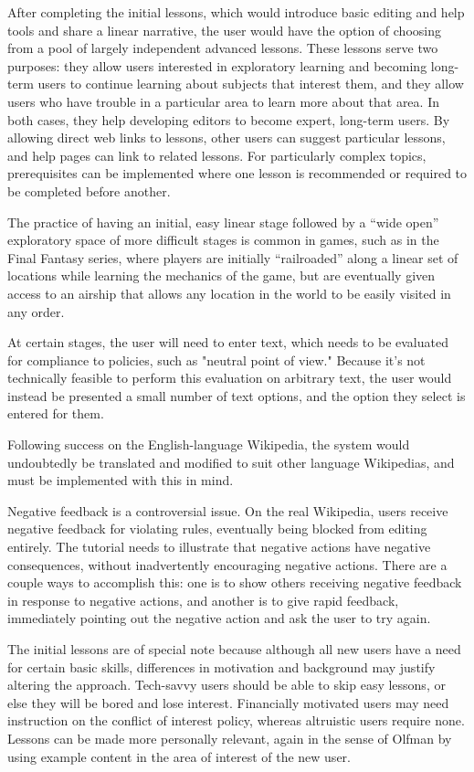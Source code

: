 \documentclass{acm_proc_article-sp}
\begin{document}
After completing the initial lessons, which would introduce basic editing and help tools and share a linear narrative, the user would have the option of choosing from a pool of largely independent advanced lessons. These lessons serve two purposes: they allow users interested in exploratory learning and becoming long-term users to continue learning about subjects that interest them, and they allow users who have trouble in a particular area to learn more about that area. In both cases, they help developing editors to become expert, long-term users. By allowing direct web links to lessons, other users can suggest particular lessons, and help pages can link to related lessons. For particularly complex topics, prerequisites can be implemented where one lesson is recommended or required to be completed before another.

The practice of having an initial, easy linear stage followed by a ``wide open'' exploratory space of more difficult stages is common in games, such as in the Final Fantasy series, where players are initially ``railroaded'' along a linear set of locations while learning the mechanics of the game, but are eventually given access to an airship that allows any location in the world to be easily visited in any order.

At certain stages, the user will need to enter text, which needs to be evaluated for compliance to policies, such as "neutral point of view." Because it's not technically feasible to perform this evaluation on arbitrary text, the user would instead be presented a small number of text options, and the option they select is entered for them.

Following success on the English-language Wikipedia, the system would undoubtedly be translated and modified to suit other language Wikipedias, and must be implemented with this in mind.

Negative feedback is a controversial issue. On the real Wikipedia, users receive negative feedback for violating rules, eventually being blocked from editing entirely. The tutorial needs to illustrate that negative actions have negative consequences, without inadvertently encouraging negative actions. There are a couple ways to accomplish this: one is to show others receiving negative feedback in response to negative actions, and another is to give rapid feedback, immediately pointing out the negative action and ask the user to try again.

The initial lessons are of special note because although all new users have a need for certain basic skills, differences in motivation and background may justify altering the approach. Tech-savvy users should be able to skip easy lessons, or else they will be bored and lose interest.  Financially motivated users may need instruction on the conflict of interest policy, whereas altruistic users require none. Lessons can be made more personally relevant, again in the sense of Olfman\cite{Olfman:1991} by using example content in the area of interest of the new user.
\end{document}
